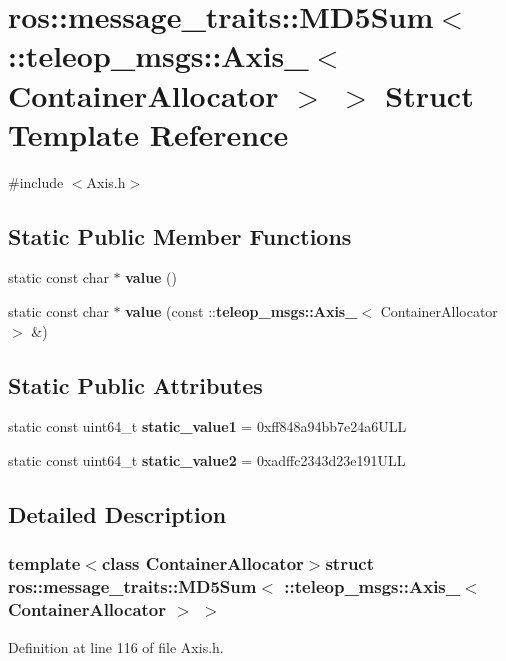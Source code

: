 \section{ros::message\_\-traits::MD5Sum$<$ ::teleop\_\-msgs::Axis\_\-$<$ ContainerAllocator $>$ $>$ Struct Template Reference}
\label{structros_1_1message__traits_1_1MD5Sum_3_01_1_1teleop__msgs_1_1Axis___3_01ContainerAllocator_01_4_01_4}


{\ttfamily \#include $<$Axis.h$>$}

\subsection*{Static Public Member Functions}
\begin{DoxyCompactItemize}
\item 
static const char $\ast$ {\bf value} ()
\item 
static const char $\ast$ {\bf value} (const ::{\bf teleop\_\-msgs::Axis\_\-}$<$ ContainerAllocator $>$ \&)
\end{DoxyCompactItemize}
\subsection*{Static Public Attributes}
\begin{DoxyCompactItemize}
\item 
static const uint64\_\-t {\bf static\_\-value1} = 0xff848a94bb7e24a6ULL
\item 
static const uint64\_\-t {\bf static\_\-value2} = 0xadffc2343d23e191ULL
\end{DoxyCompactItemize}


\subsection{Detailed Description}
\subsubsection*{template$<$class ContainerAllocator$>$struct ros::message\_\-traits::MD5Sum$<$ ::teleop\_\-msgs::Axis\_\-$<$ ContainerAllocator $>$ $>$}



Definition at line 116 of file Axis.h.



